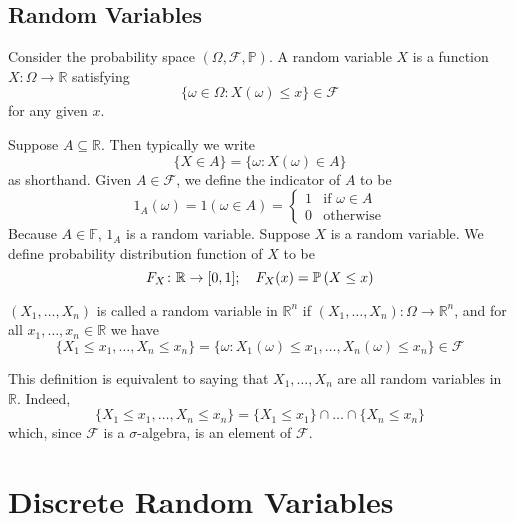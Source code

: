 \documentclass{article}
\begin{document}
\subsection{Random Variables}
\begin{definition}
    Consider the probability space $(\Omega, \mathcal F, \mathbb P)$. A random variable $X$ is a function $X \colon \Omega \to \mathbb R$ satisfying
    \[ \{ \omega \in \Omega \colon X(\omega) \leq x \} \in \mathcal F \]
    for any given $x$.
\end{definition}
\noindent Suppose $A \subseteq \mathbb R$. Then typically we write
\[ \{ X \in A \} = \{ \omega \colon X(\omega) \in A \} \]
as shorthand. Given $A \in \mathcal F$, we define the indicator of $A$ to be
\[ 1_A(\omega) = 1(\omega \in A) = \begin{cases}
        1 & \text{if } \omega \in A \\
        0 & \text{otherwise}
    \end{cases} \]
Because $A \in \mathbb F$, $1_A$ is a random variable. Suppose $X$ is a random variable. We define probability distribution function of $X$ to be
\[ F_X \colon \mathbb R \to [0, 1];\quad F_X(x) = \mathbb{P}\left({X \leq x}\right) \]
\begin{definition}
    $(X_1, \dots, X_n)$ is called a random variable in $\mathbb R^n$ if $(X_1, \dots, X_n) \colon \Omega \to \mathbb R^n$, and for all $x_1, \dots, x_n \in \mathbb R$ we have
    \[ \{ X_1 \leq x_1, \dots, X_n \leq x_n \} = \{ \omega \colon X_1(\omega) \leq x_1, \dots, X_n(\omega) \leq x_n \} \in \mathcal F \]
\end{definition}
\noindent This definition is equivalent to saying that $X_1, \dots, X_n$ are all random variables in $\mathbb R$. Indeed,
\[ \{ X_1 \leq x_1, \dots, X_n \leq x_n \} = \{ X_1 \leq x_1 \} \cap \dots \cap \{ X_n \leq x_n \} \]
which, since $\mathcal F$ is a $\sigma$-algebra, is an element of $\mathcal F$.

\section{Discrete Random Variables}
\end{document}
